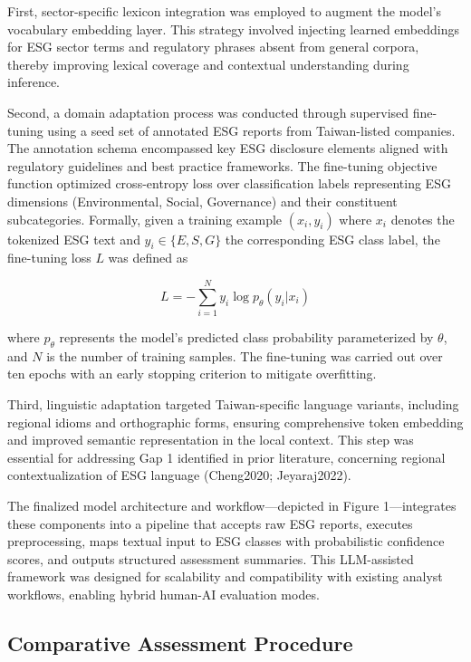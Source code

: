 \documentclass[
  12pt,
]{article}
\begin{document}
First, sector-specific lexicon integration was employed to augment the
model's vocabulary embedding layer. This strategy involved injecting
learned embeddings for ESG sector terms and regulatory phrases absent
from general corpora, thereby improving lexical coverage and contextual
understanding during inference.

Second, a domain adaptation process was conducted through supervised
fine-tuning using a seed set of annotated ESG reports from Taiwan-listed
companies. The annotation schema encompassed key ESG disclosure elements
aligned with regulatory guidelines and best practice frameworks. The
fine-tuning objective function optimized cross-entropy loss over
classification labels representing ESG dimensions (Environmental,
Social, Governance) and their constituent subcategories. Formally, given
a training example \((x_i, y_i)\) where \(x_i\) denotes the tokenized
ESG text and \(y_i \in \{E, S, G\}\) the corresponding ESG class label,
the fine-tuning loss \(L\) was defined as

\[
L = - \sum_{i=1}^N y_i \log p_\theta(y_i | x_i)
\]

where \(p_\theta\) represents the model's predicted class probability
parameterized by \(\theta\), and \(N\) is the number of training
samples. The fine-tuning was carried out over ten epochs with an early
stopping criterion to mitigate overfitting.

Third, linguistic adaptation targeted Taiwan-specific language variants,
including regional idioms and orthographic forms, ensuring comprehensive
token embedding and improved semantic representation in the local
context. This step was essential for addressing Gap 1 identified in
prior literature, concerning regional contextualization of ESG language
(Cheng2020; Jeyaraj2022).

The finalized model architecture and workflow---depicted in Figure
1---integrates these components into a pipeline that accepts raw ESG
reports, executes preprocessing, maps textual input to ESG classes with
probabilistic confidence scores, and outputs structured assessment
summaries. This LLM-assisted framework was designed for scalability and
compatibility with existing analyst workflows, enabling hybrid human-AI
evaluation modes.

\subsection{Comparative Assessment
Procedure}\label{comparative-assessment-procedure}
\end{document}
